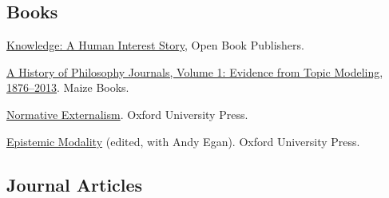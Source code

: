 \documentclass[
  10pt,
  letterpaper,
  DIV=11,
  numbers=noendperiod,
  twoside]{scrartcl}
\providecommand{\tightlist}{%
  \setlength{\itemsep}{0pt}\setlength{\parskip}{0pt}}\usepackage{longtable,booktabs,array}
\begin{document}
\subsection{Books}\label{books}

\begin{description}
\tightlist
\item[2024]
\href{https://www.openbookpublishers.com/books/10.11647/obp.0425}{Knowledge:
A Human Interest Story}, Open Book Publishers.
\item[2022]
\href{https://www.fulcrum.org/concern/monographs/2v23vw98g}{A History of
Philosophy Journals, Volume 1: Evidence from Topic Modeling,
1876--2013}. Maize Books.
\item[2019]
\href{https://global.oup.com/academic/product/normative-externalism-9780199696536}{Normative
Externalism}. Oxford University Press.
\item[2011]
\href{https://global.oup.com/academic/product/epistemic-modality-9780199591589}{Epistemic
Modality} (edited, with Andy Egan). Oxford University Press.
\end{description}

\subsection{Journal Articles}\label{journal-articles}
\end{document}
